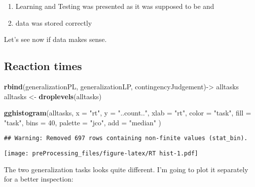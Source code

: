 \documentclass[
]{article}
\newenvironment{Shaded}{\begin{snugshade}}{\end{snugshade}}
\newcommand{\DataTypeTok}[1]{\textcolor[rgb]{0.13,0.29,0.53}{#1}}
\newcommand{\DecValTok}[1]{\textcolor[rgb]{0.00,0.00,0.81}{#1}}
\newcommand{\KeywordTok}[1]{\textcolor[rgb]{0.13,0.29,0.53}{\textbf{#1}}}
\newcommand{\NormalTok}[1]{#1}
\newcommand{\StringTok}[1]{\textcolor[rgb]{0.31,0.60,0.02}{#1}}
\begin{document}
\begin{enumerate}
\def\labelenumi{\arabic{enumi}.}
\item
  Learning and Testing was presented as it was supposed to be and
\item
  data was stored correctly
\end{enumerate}

Let's see now if data makes sense.

\hypertarget{reaction-times}{%
\subsection{Reaction times}\label{reaction-times}}

\begin{Shaded}
\begin{Highlighting}[]
\KeywordTok{rbind}\NormalTok{(generalizationPL, generalizationLP, contingencyJudgement)->}\StringTok{ }\NormalTok{alltasks}
\NormalTok{alltasks <-}\StringTok{ }\KeywordTok{droplevels}\NormalTok{(alltasks)}
\end{Highlighting}
\end{Shaded}

\begin{Shaded}
\begin{Highlighting}[]
\KeywordTok{gghistogram}\NormalTok{(alltasks,}
       \DataTypeTok{x =} \StringTok{"rt"}\NormalTok{,}
       \DataTypeTok{y =} \StringTok{"..count.."}\NormalTok{,}
       \DataTypeTok{xlab =} \StringTok{"rt"}\NormalTok{, }
       \DataTypeTok{color =} \StringTok{"task"}\NormalTok{, }
       \DataTypeTok{fill =} \StringTok{"task"}\NormalTok{,}
       \DataTypeTok{bins =} \DecValTok{40}\NormalTok{,}
       \DataTypeTok{palette =} \StringTok{"jco"}\NormalTok{,}
       \DataTypeTok{add =} \StringTok{"median"}
\NormalTok{)}
\end{Highlighting}
\end{Shaded}

\begin{verbatim}
## Warning: Removed 697 rows containing non-finite values (stat_bin).
\end{verbatim}

\texttt{[image: preProcessing\_files/figure-latex/RT hist-1.pdf]}

The two generalization tasks looks quite different. I'm going to plot it
separately for a better inspection:
\end{document}
